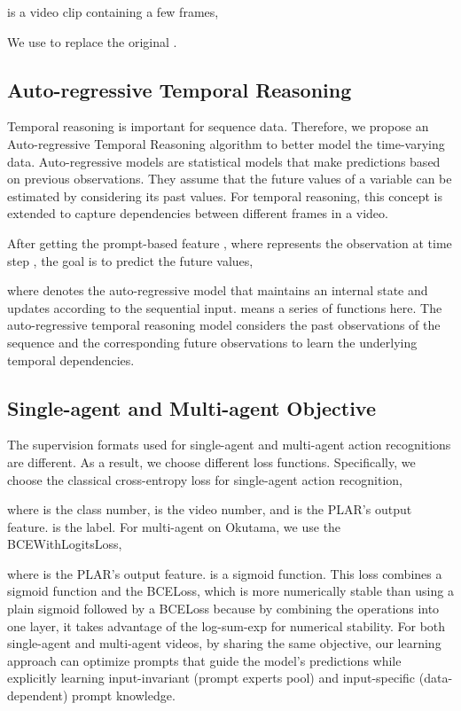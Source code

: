 \documentclass[letterpaper, 10 pt, conference]{ieeeconf}
\begin{document}
 is a video clip containing a few frames, 
 
 We use  to replace the original . 





\subsection{Auto-regressive Temporal Reasoning}
Temporal reasoning is important for sequence data. Therefore, we propose an Auto-regressive Temporal Reasoning algorithm to better model the time-varying data. Auto-regressive models are statistical models that make predictions based on previous observations. They assume that the future values of a variable can be estimated by considering its past values. For temporal reasoning, this concept is extended to capture dependencies between different frames in a video.

After getting the prompt-based feature , where  represents the observation at time step , the goal is to predict the future values,

where  denotes the auto-regressive model that maintains an internal state and updates according to the sequential input.  means a series of functions here. The auto-regressive temporal reasoning model considers the past observations of the sequence and the corresponding future observations to learn the underlying temporal dependencies. 

\subsection{Single-agent and Multi-agent Objective}
 The supervision formats used for single-agent and multi-agent action recognitions are different. As a result, we choose different loss functions. Specifically, we choose the classical cross-entropy loss for single-agent action recognition, 

where  is the class number,  is the video number,  and  is the PLAR's output feature.  is the label. For multi-agent on Okutama, we use the BCEWithLogitsLoss,

where  is the PLAR's output feature.  is a sigmoid function. This loss combines a sigmoid function and the BCELoss, which is more numerically stable than using a plain sigmoid followed by a BCELoss because by combining the operations into one layer, it takes advantage of the log-sum-exp for numerical stability. For both single-agent and multi-agent videos, by sharing the same objective, our learning approach can optimize prompts that guide the model's predictions while explicitly learning input-invariant (prompt experts pool) and input-specific (data-dependent) prompt knowledge. 
\end{document}
